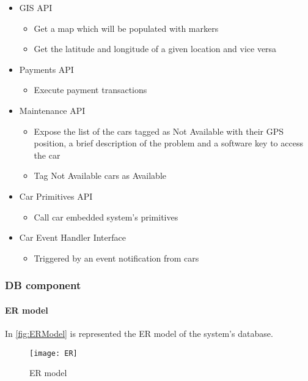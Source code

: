 \begin{itemize}
	\item GIS API
	\begin{itemize}
		\item Get a map which will be populated with markers
		\item Get the latitude and  longitude of a given location and vice versa
	\end{itemize}
	
	\item Payments API
	\begin{itemize}
		\item Execute payment transactions
	\end{itemize}
	
	\item Maintenance API
	\begin{itemize}
		\item Expose the list of the cars tagged as Not Available with their GPS position, a brief description of the problem and a software key to access the car
		\item Tag Not Available cars as Available
	\end{itemize}
	
	\item Car Primitives API
	\begin{itemize}
		\item Call car embedded system's primitives
	\end{itemize}
	
	\item Car Event Handler Interface
	\begin{itemize}
		\item Triggered by an event notification from cars
	\end{itemize}
\end{itemize}
\clearpage

\subsubsection{DB component}
\paragraph{ER model}In \autoref{fig:ERModel} is represented the ER model of the system's database.

\begin{figure}[h!]
	\centering
	\texttt{[image: ER]}
	\caption{
		\label{fig:ERModel} 
		ER model
	}
\end{figure}

